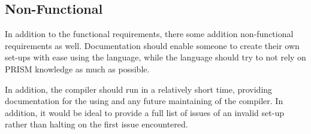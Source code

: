 \documentclass[report.tex]{subfiles}
\begin{document}
\subsection{Non-Functional} %
\label{sub:non_functional}
In addition to the functional requirements, there some addition non-functional
requirements as well. Documentation should enable someone to create their own
set-ups with ease using the language, while the language should try to not rely
on PRISM knowledge as much as possible.

In addition, the compiler should run in a relatively short time, providing
documentation for the using and any future maintaining of the compiler. In
addition, it would be ideal to provide a full list of issues of an invalid
set-up rather than halting on the first issue encountered.
\newpage
\end{document}
